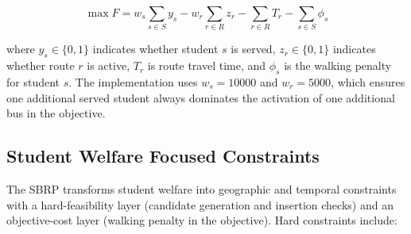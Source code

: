 \documentclass[journal]{IEEEtran}
\begin{document}
\begin{equation}
\max F = w_s\!\sum_{s\in S} y_s - w_r\!\sum_{r\in R} z_r - 
\sum_{r\in R} T_r - \sum_{s\in S} \phi_s
\end{equation}

where $y_s\in\{0,1\}$ indicates whether student $s$ is served, 
$z_r\in\{0,1\}$ indicates whether route $r$ is active, $T_r$ is 
route travel time, and $\phi_s$ is the walking penalty for student 
$s$. The implementation uses $w_s=10000$ and $w_r=5000$, which 
ensures one additional served student always dominates the activation 
of one additional bus in the objective.

\subsection{Student Welfare Focused Constraints}

The SBRP transforms student welfare into geographic and temporal 
constraints with a hard-feasibility layer (candidate generation and 
insertion checks) and an objective-cost layer (walking penalty in the 
objective). Hard constraints include:
\end{document}
